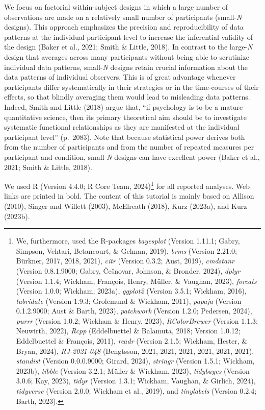 \documentclass[
  man,floatsintext]{apa6}
\begin{document}
We focus on factorial within-subject designs in which a large number of observations are made on a relatively small number of participants (small-\emph{N} designs). This approach emphasizes the precision and reproducibility of data patterns at the individual participant level to increase the inferential validity of the design (Baker et al., 2021; Smith \& Little, 2018). In contrast to the large-\emph{N} design that averages across many participants without being able to scrutinize individual data patterns, small-\emph{N} designs retain crucial information about the data patterns of individual observers. This is of great advantage whenever participants differ systematically in their strategies or in the time-courses of their effects, so that blindly averaging them would lead to misleading data patterns. Indeed, Smith and Little (2018) argue that, ``if psychology is to be a mature quantitative science, then its primary theoretical aim should be to investigate systematic functional relationships as they are manifested at the individual participant level'' (p.~2083). Note that because statistical power derives both from the number of participants and from the number of repeated measures per participant and condition, small-\emph{N} designs can have excellent power (Baker et al., 2021; Smith \& Little, 2018).

We used R (Version 4.4.0; R Core Team, 2024)\footnote{We, furthermore, used the R-packages \emph{bayesplot} (Version 1.11.1; Gabry, Simpson, Vehtari, Betancourt, \& Gelman, 2019), \emph{brms} (Version 2.21.0; Bürkner, 2017, 2018, 2021), \emph{citr} (Version 0.3.2; Aust, 2019), \emph{cmdstanr} (Version 0.8.1.9000; Gabry, Češnovar, Johnson, \& Bronder, 2024), \emph{dplyr} (Version 1.1.4; Wickham, François, Henry, Müller, \& Vaughan, 2023), \emph{forcats} (Version 1.0.0; Wickham, 2023a), \emph{ggplot2} (Version 3.5.1; Wickham, 2016), \emph{lubridate} (Version 1.9.3; Grolemund \& Wickham, 2011), \emph{papaja} (Version 0.1.2.9000; Aust \& Barth, 2023), \emph{patchwork} (Version 1.2.0; Pedersen, 2024), \emph{purrr} (Version 1.0.2; Wickham \& Henry, 2023), \emph{RColorBrewer} (Version 1.1.3; Neuwirth, 2022), \emph{Rcpp} (Eddelbuettel \& Balamuta, 2018; Version 1.0.12; Eddelbuettel \& François, 2011), \emph{readr} (Version 2.1.5; Wickham, Hester, \& Bryan, 2024), \emph{RJ-2021-048} (Bengtsson, 2021, 2021, 2021, 2021, 2021, 2021), \emph{standist} (Version 0.0.0.9000; Girard, 2024), \emph{stringr} (Version 1.5.1; Wickham, 2023b), \emph{tibble} (Version 3.2.1; Müller \& Wickham, 2023), \emph{tidybayes} (Version 3.0.6; Kay, 2023), \emph{tidyr} (Version 1.3.1; Wickham, Vaughan, \& Girlich, 2024), \emph{tidyverse} (Version 2.0.0; Wickham et al., 2019), and \emph{tinylabels} (Version 0.2.4; Barth, 2023).} for all reported analyses. Web links are printed in bold. The content of this tutorial is mainly based on Allison (2010), Singer and Willett (2003), McElreath (2018), Kurz (2023a), and Kurz (2023b).
\end{document}

